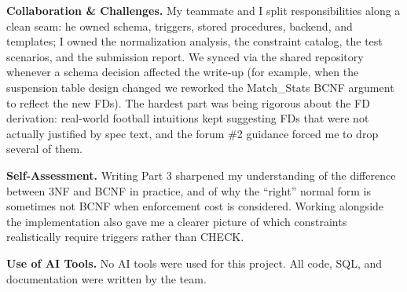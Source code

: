 \documentclass[12pt]{article}
\begin{document}
\textbf{Collaboration \& Challenges.}
My teammate and I split responsibilities along a clean seam: he
owned schema, triggers, stored procedures, backend, and templates;
I owned the normalization analysis, the constraint catalog, the test
scenarios, and the submission report. We synced via the shared
repository whenever a schema decision affected the write-up (for
example, when the suspension table design changed we reworked the
Match\_Stats BCNF argument to reflect the new FDs). The hardest part
was being rigorous about the FD derivation: real-world football
intuitions kept suggesting FDs that were not actually justified by
spec text, and the forum \#2 guidance forced me to drop several of
them.

\textbf{Self-Assessment.}
Writing Part 3 sharpened my understanding of the difference between
3NF and BCNF in practice, and of why the ``right'' normal form is
sometimes not BCNF when enforcement cost is considered. Working
alongside the implementation also gave me a clearer picture of which
constraints realistically require triggers rather than CHECK.

\textbf{Use of AI Tools.}
No AI tools were used for this project. All code, SQL, and
documentation were written by the team.
\end{document}
